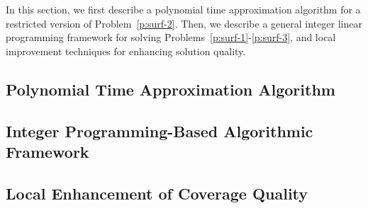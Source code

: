 In this section, we first describe a polynomial time approximation algorithm for a restricted version of Problem~\ref{p:surf-2}. 
Then, we describe a general integer linear programming framework for solving Problems~\ref{p:surf-1}-\ref{p:surf-3},
and local improvement techniques for enhancing solution quality.

\subsection{Polynomial Time Approximation Algorithm}
\vspace{-1mm}


\vspace{-1mm}
\subsection{Integer Programming-Based Algorithmic Framework}


\subsection{Local Enhancement of Coverage Quality}

